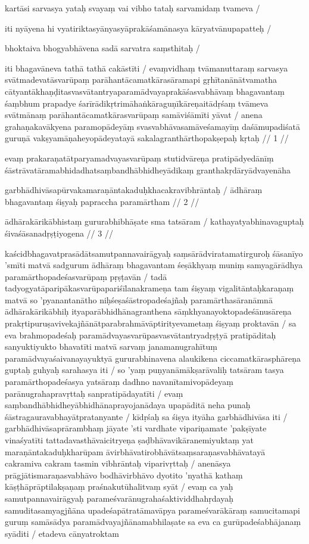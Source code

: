 kartāsi sarvasya yataḥ svayaṃ vai vibho tataḥ sarvamidaṃ tvameva  /

iti nyāyena hi vyatiriktasyānyasyāprakāśamānasya kāryatvānupapatteḥ  /

bhoktaiva bhogyabhāvena sadā sarvatra saṃsthitaḥ  /

iti bhagavāneva tathā tathā cakāstīti  / evaṃvidhaṃ tvāmanuttaraṃ sarvasya svātmadevatāsvarūpaṃ parāhantācamatkārasāramapi gṛhītanānātvamatha cātyantākhaṇḍitasvasvātantryaparamādvayaprakāśasvabhāvaṃ bhagavantaṃ śaṃbhum prapadye śarīrādikṛtrimāhaṅkāraguṇīkāreṇaitādṛśaṃ tvāmeva svātmānaṃ parāhantācamatkārasvarūpaṃ samāviśāmīti yāvat  / anena grahaṇakavākyena paramopādeyāṃ svasvabhāvasamāveśamayīṃ daśāmupadiśatā guruṇā vakṣyamāṇaheyopādeyatayā sakalagranthārthopakṣepaḥ kṛtaḥ  // 1  //

evaṃ prakaraṇatātparyamadvayasvarūpaṃ stutidvāreṇa pratipādyedānīṃ śāstrāvatāramabhidadhatsaṃbandhābhidheyādikaṃ granthakṛdāryādvayenāha

garbhādhivāsapūrvakamaraṇāntakaduḥkhacakravibhrāntaḥ  /
ādhāraṃ bhagavantaṃ śiṣyaḥ papraccha paramārtham  // 2  //

ādhārakārikābhistaṃ gururabhibhāṣate sma tatsāram  /
kathayatyabhinavaguptaḥ śivaśāsanadṛṣṭiyogena  // 3  //

kaścidbhagavatprasādātsamutpannavairāgyaḥ saṃsārādviratamatirguroḥ śāsanīyo 'smīti matvā sadgurum ādhāraṃ bhagavantam śeṣākhyaṃ muniṃ samyagārādhya paramārthopadeśasvarūpaṃ pṛṣṭavān  / tadā tadyogyatāparipākasvarūpapariśīlanakrameṇa tam śiṣyaṃ vigalitāntaḥkaraṇaṃ matvā so 'pyanantanātho niḥśeṣaśāstropadeśajñaḥ paramārthasāranāmnā ādhārakārikābhiḥ ityaparābhidhānagranthena sāṃkhyanayoktopadeśānusāreṇa prakṛtipuruṣavivekajñānātparabrahmāvāptirityevametaṃ śiṣyaṃ proktavān  / sa eva brahmopadeśaḥ paramādvayasvarūpasvasvātantryadṛṣṭyā pratipāditaḥ sanyuktiyukto bhavatīti matvā sarvaṃ janamanugrahītuṃ paramādvayaśaivanayayuktyā gururabhinavena alaukikena ciccamatkārasphāreṇa guptaḥ guhyaḥ sarahasya iti  / so 'yaṃ puṇyanāmākṣarāvaliḥ tatsāram tasya paramārthopadeśasya yatsāraṃ dadhno navanītamivopādeyaṃ parānugrahapravṛttaḥ sanpratipādayatīti  / evaṃ saṃbandhābhidheyābhidhānaprayojanādaya upapāditā neha punaḥ śāstragauravabhayātpratanyante  / kīdṛśaḥ sa śiṣya ityāha garbhādhivāsa iti  / garbhādhivāsaprārambhaṃ jāyate 'sti vardhate vipariṇamate 'pakṣīyate vinaśyatīti tattadavasthāvaicitryeṇa ṣaḍbhāvavikāranemiyuktaṃ yat maraṇāntakaduḥkharūpam āvirbhāvatirobhāvātsaṃsaraṇasvabhāvatayā cakramiva cakram tasmin vibhrāntaḥ viparivṛttaḥ  / anenāsya prāgjātismaraṇasvabhāvo bodhāvirbhāvo dyotito 'nyathā kathaṃ kāṣṭhāprāptilakṣaṇaṃ praśnakutūhalitvaṃ syāt  / evaṃ ca yaḥ samutpannavairāgyaḥ parameśvarānugrahaśaktividdhahṛdayaḥ samuditasamyagjñāna upadeśapātratāmavāpya parameśvarākāraṃ samucitamapi guruṃ samāsādya paramādvayajñānamabhilaṣate sa eva ca gurūpadeśabhājanaṃ syāditi  / etadeva cānyatroktam

